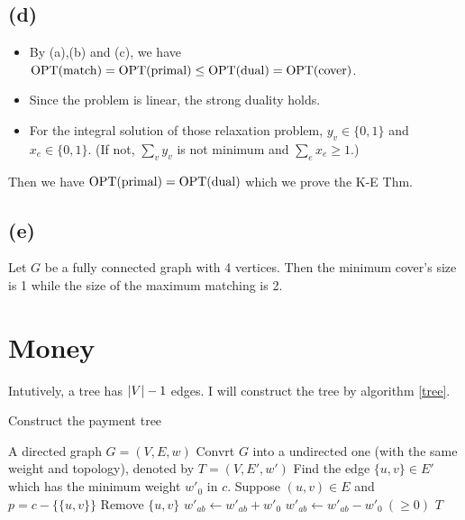 \documentclass{article}
\begin{document}
\subsection*{(d)}
\begin{itemize}
	\item 
		By (a),(b) and (c), we have $\-{OPT}(\-{match})=\-{OPT}(\-{primal})\le \-{OPT}(\-{dual})=\-{OPT}(\-{cover})$.
	\item 
		Since the problem is linear, the strong duality holds.
	\item
		For the integral solution of those relaxation problem, $y_v\in\{0,1\}$ and $x_e\in\{0,1\}$. (If not, $\sum_vy_v$ is not minimum and $\sum_ex_e\ge 1$.)
\end{itemize}

Then we have $\-{OPT}(\-{primal})=\-{OPT}(\-{dual})$ which we prove the K-E Thm.

\subsection*{(e)}
Let $G$ be a fully connected graph with 4 vertices.
Then the minimum cover's size is 1 while the size of the maximum matching is 2.

\section{Money}
Intutively, a tree has $\abs{V}-1$ edges. I will construct the tree by algorithm \ref{tree}.

\begin{algorithm}[htbp]
	\caption{Construct the payment tree}
	\label{tree}
	\begin{algorithmic}[1]
		\renewcommand{\algorithmicrequire}{\textbf{Input:}}
		\renewcommand{\algorithmicensure}{\textbf{Output:}}
		\renewcommand{\algorithmiccomment}[1]{\hfill\textit{\textcolor{blue}{\##1}}}
		\REQUIRE A directed graph $G=(V,E,w)$
		\STATE Convrt $G$ into a undirected one (with the same weight and topology), denoted by $T=(V,E',w')$
		\STATE Find the edge $\{u,v\}\in E'$ which has the minimum weight $w'_0$ in $c$.
		\STATE Suppose $(u,v)\in E$ and $p=c-\{\{u,v\}\}$
		\STATE Remove $\{u,v\}$
		\STATE $w'_{ab}\gets w'_{ab}+w'_0$
		\ELSE
		\STATE $w'_{ab}\gets w'_{ab}-w'_0 \ (\ge0)$
		\ENDIF
		\ENDFOR
		\ENDWHILE
		\RETURN $T$
	\end{algorithmic}
\end{algorithm}
\end{document}
